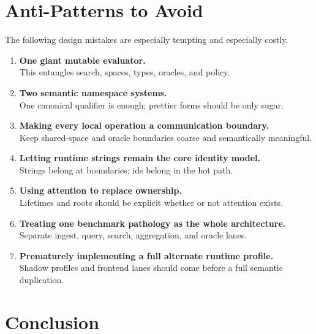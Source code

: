 \documentclass[11pt]{article}
\begin{document}
\section{Anti-Patterns to Avoid}

The following design mistakes are especially tempting and especially costly.

\begin{enumerate}[leftmargin=2em]
  \item \textbf{One giant mutable evaluator.}\\
  This entangles search, spaces, types, oracles, and policy.

  \item \textbf{Two semantic namespace systems.}\\
  One canonical qualifier is enough; prettier forms should be only sugar.

  \item \textbf{Making every local operation a communication boundary.}\\
  Keep shared-space and oracle boundaries coarse and semantically meaningful.

  \item \textbf{Letting runtime strings remain the core identity model.}\\
  Strings belong at boundaries; ids belong in the hot path.

  \item \textbf{Using attention to replace ownership.}\\
  Lifetimes and roots should be explicit whether or not attention exists.

  \item \textbf{Treating one benchmark pathology as the whole architecture.}\\
  Separate ingest, query, search, aggregation, and oracle lanes.

  \item \textbf{Prematurely implementing a full alternate runtime profile.}\\
  Shadow profiles and frontend lanes should come before a full semantic duplication.
\end{enumerate}

\section{Conclusion}
\end{document}
